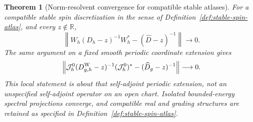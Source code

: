 \documentclass[11pt]{article}
\newtheorem{theorem}{Theorem}[section]
\theoremstyle{definition}
\theoremstyle{remark}
\theoremstyle{definition}
\theoremstyle{remark}
\newcommand{\R}{\mathbb R}
\begin{document}
\begin{theorem}[Norm-resolvent convergence for compatible stable atlases]
\label{thm:supp-compact-spin-resolvent}
For a compatible stable spin discretization in the sense of
Definition~\ref{def:stable-spin-atlas}, and every $z\notin\R$,
\begin{equation}
 \left\|W_h(D_h-z)^{-1}W_h^*-(\widehat D-z)^{-1}\right\|
       \longrightarrow0.
 \label{eq:supp-global-norm-resolvent}
\end{equation}
The same argument on a fixed smooth periodic coordinate extension gives
\begin{equation}
 \left\|\mathcal J_h^0(D_{g,h}^{\rm W}-z)^{-1}(\mathcal J_h^0)^*
       -(\widehat D_g-z)^{-1}\right\|\longrightarrow0.
 \label{eq:supp-local-norm-resolvent}
\end{equation}
This local statement is about that self-adjoint periodic extension, not an
unspecified self-adjoint operator on an open chart.  Isolated bounded-energy
spectral projections converge, and compatible real and grading structures
are retained as specified in Definition~\ref{def:stable-spin-atlas}.
\end{theorem}
\end{document}
